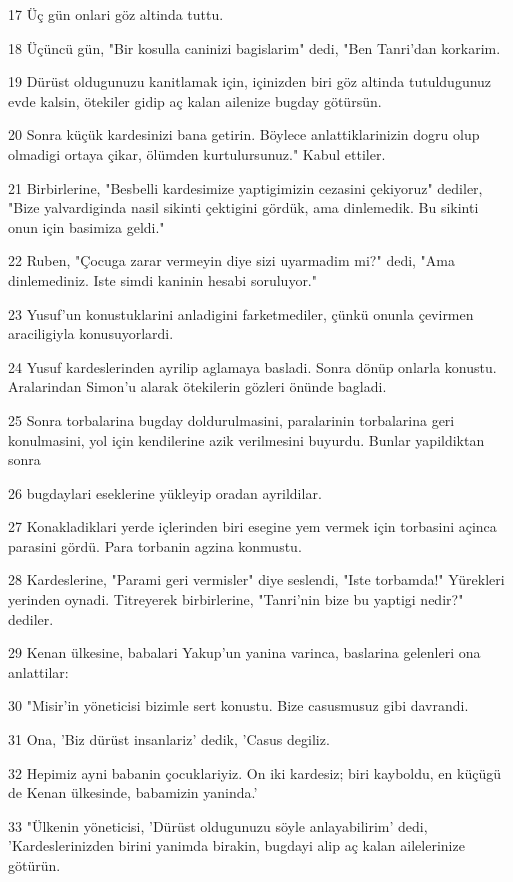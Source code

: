 \par 17 Üç gün onlari göz altinda tuttu.
\par 18 Üçüncü gün, "Bir kosulla caninizi bagislarim" dedi, "Ben Tanri'dan korkarim.
\par 19 Dürüst oldugunuzu kanitlamak için, içinizden biri göz altinda tutuldugunuz evde kalsin, ötekiler gidip aç kalan ailenize bugday götürsün.
\par 20 Sonra küçük kardesinizi bana getirin. Böylece anlattiklarinizin dogru olup olmadigi ortaya çikar, ölümden kurtulursunuz." Kabul ettiler.
\par 21 Birbirlerine, "Besbelli kardesimize yaptigimizin cezasini çekiyoruz" dediler, "Bize yalvardiginda nasil sikinti çektigini gördük, ama dinlemedik. Bu sikinti onun için basimiza geldi."
\par 22 Ruben, "Çocuga zarar vermeyin diye sizi uyarmadim mi?" dedi, "Ama dinlemediniz. Iste simdi kaninin hesabi soruluyor."
\par 23 Yusuf'un konustuklarini anladigini farketmediler, çünkü onunla çevirmen araciligiyla konusuyorlardi.
\par 24 Yusuf kardeslerinden ayrilip aglamaya basladi. Sonra dönüp onlarla konustu. Aralarindan Simon'u alarak ötekilerin gözleri önünde bagladi.
\par 25 Sonra torbalarina bugday doldurulmasini, paralarinin torbalarina geri konulmasini, yol için kendilerine azik verilmesini buyurdu. Bunlar yapildiktan sonra
\par 26 bugdaylari eseklerine yükleyip oradan ayrildilar.
\par 27 Konakladiklari yerde içlerinden biri esegine yem vermek için torbasini açinca parasini gördü. Para torbanin agzina konmustu.
\par 28 Kardeslerine, "Parami geri vermisler" diye seslendi, "Iste torbamda!" Yürekleri yerinden oynadi. Titreyerek birbirlerine, "Tanri'nin bize bu yaptigi nedir?" dediler.
\par 29 Kenan ülkesine, babalari Yakup'un yanina varinca, baslarina gelenleri ona anlattilar:
\par 30 "Misir'in yöneticisi bizimle sert konustu. Bize casusmusuz gibi davrandi.
\par 31 Ona, 'Biz dürüst insanlariz' dedik, 'Casus degiliz.
\par 32 Hepimiz ayni babanin çocuklariyiz. On iki kardesiz; biri kayboldu, en küçügü de Kenan ülkesinde, babamizin yaninda.'
\par 33 "Ülkenin yöneticisi, 'Dürüst oldugunuzu söyle anlayabilirim' dedi, 'Kardeslerinizden birini yanimda birakin, bugdayi alip aç kalan ailelerinize götürün.

